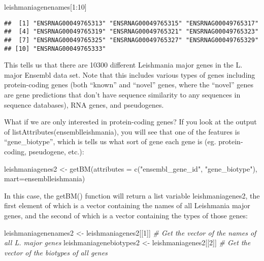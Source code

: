 \documentclass[
]{book}
\newenvironment{Shaded}{\begin{snugshade}}{\end{snugshade}}
\newcommand{\AttributeTok}[1]{\textcolor[rgb]{0.77,0.63,0.00}{#1}}
\newcommand{\CommentTok}[1]{\textcolor[rgb]{0.56,0.35,0.01}{\textit{#1}}}
\newcommand{\DecValTok}[1]{\textcolor[rgb]{0.00,0.00,0.81}{#1}}
\newcommand{\FunctionTok}[1]{\textcolor[rgb]{0.00,0.00,0.00}{#1}}
\newcommand{\NormalTok}[1]{#1}
\newcommand{\OtherTok}[1]{\textcolor[rgb]{0.56,0.35,0.01}{#1}}
\newcommand{\SpecialCharTok}[1]{\textcolor[rgb]{0.00,0.00,0.00}{#1}}
\newcommand{\StringTok}[1]{\textcolor[rgb]{0.31,0.60,0.02}{#1}}
\begin{document}
\begin{Shaded}
\begin{Highlighting}[]
\NormalTok{leishmaniagenenames[}\DecValTok{1}\SpecialCharTok{:}\DecValTok{10}\NormalTok{]}
\end{Highlighting}
\end{Shaded}

\begin{verbatim}
##  [1] "ENSRNAG00049765313" "ENSRNAG00049765315" "ENSRNAG00049765317"
##  [4] "ENSRNAG00049765319" "ENSRNAG00049765321" "ENSRNAG00049765323"
##  [7] "ENSRNAG00049765325" "ENSRNAG00049765327" "ENSRNAG00049765329"
## [10] "ENSRNAG00049765333"
\end{verbatim}

This tells us that there are 10300 different Leishmania major genes in the L. major Ensembl data set. Note that this includes various types of genes including protein-coding genes (both ``known'' and ``novel'' genes, where the ``novel'' genes are gene predictions that don't have sequence similarity to any sequences in sequence databases), RNA genes, and pseudogenes.

What if we are only interested in protein-coding genes? If you look at the output of listAttributes(ensemblleishmania), you will see that one of the features is ``gene\_biotype'', which is tells us what sort of gene each gene is (eg. protein-coding, pseudogene, etc.):

\begin{Shaded}
\begin{Highlighting}[]
\NormalTok{leishmaniagenes2 }\OtherTok{\textless{}{-}} \FunctionTok{getBM}\NormalTok{(}\AttributeTok{attributes =} \FunctionTok{c}\NormalTok{(}\StringTok{"ensembl\_gene\_id"}\NormalTok{, }\StringTok{"gene\_biotype"}\NormalTok{), }\AttributeTok{mart=}\NormalTok{ensemblleishmania)}
\end{Highlighting}
\end{Shaded}

In this case, the getBM() function will return a list variable leishmaniagenes2, the first element of which is a vector containing the names of all Leishmania major genes, and the second of which is a vector containing the types of those genes:

\begin{Shaded}
\begin{Highlighting}[]
\NormalTok{leishmaniagenenames2 }\OtherTok{\textless{}{-}}\NormalTok{ leishmaniagenes2[[}\DecValTok{1}\NormalTok{]] }\CommentTok{\# Get the vector of the names of all L. major genes}
\NormalTok{leishmaniagenebiotypes2 }\OtherTok{\textless{}{-}}\NormalTok{ leishmaniagenes2[[}\DecValTok{2}\NormalTok{]] }\CommentTok{\# Get the vector of the biotypes of all genes}
\end{Highlighting}
\end{Shaded}
\end{document}

